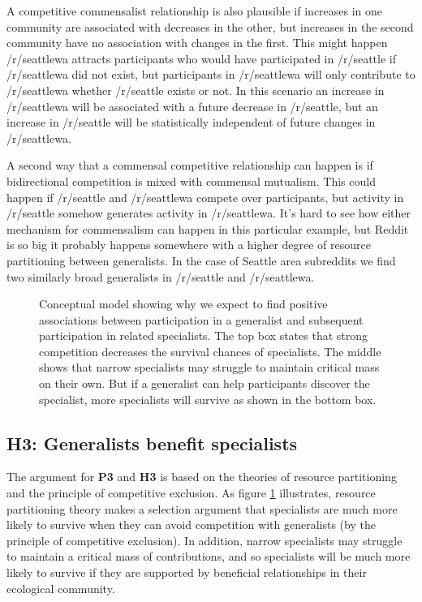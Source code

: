 \documentclass[12pt]{memoir}
\begin{document}
A competitive commensalist relationship is also plausible if increases in one community are associated with decreases in the other, but increases in the second community have no association with changes in the first.  This might happen  /r/seattlewa attracts participants who would have participated in /r/seattle if /r/seattlewa did not exist, but participants in /r/seattlewa will only contribute to /r/seattlewa whether /r/seattle exists or not.  In this scenario an increase in /r/seattlewa will be associated with a future decrease in /r/seattle, but an increase in /r/seattle will be statistically independent of future changes in /r/seattlewa.

A second way that a commensal competitive relationship can happen is if bidirectional competition is mixed with commensal mutualism. This could happen if /r/seattle and /r/seattlewa compete over participants, but activity in /r/seattle somehow generates activity in /r/seattlewa. It's hard to see how either mechanism for commensalism can happen in this particular example, but Reddit is so big it probably happens somewhere with a higher degree of resource partitioning between generalists.  In the case of Seattle area subreddits we find two similarly broad generalists in /r/seattle and /r/seattlewa.

\begin{figure}[t]

\caption{Conceptual model showing why we expect to find positive associations between participation in a generalist and subsequent participation in related specialists.  The top box states that strong competition decreases the survival chances of specialists. The middle shows that narrow specialists may struggle to maintain critical mass on their own. But if a generalist can help participants discover the specialist, more specialists will survive as shown in the bottom box. \label{fig:H3}}
\end{figure}

\subsection{\textbf{H3:} Generalists benefit specialists}

The argument for \textbf{P3} and \textbf{H3} is based on the theories of resource partitioning and the principle of competitive exclusion.  As figure \ref{fig:H3} illustrates, resource partitioning theory makes a selection argument that specialists are much more likely to survive when they can avoid competition with generalists (by the principle of competitive exclusion).  In addition, narrow specialists may struggle to maintain a critical mass of contributions, and so specialists will be much more likely to survive if they are supported by beneficial relationships in their ecological community. 
\end{document}
